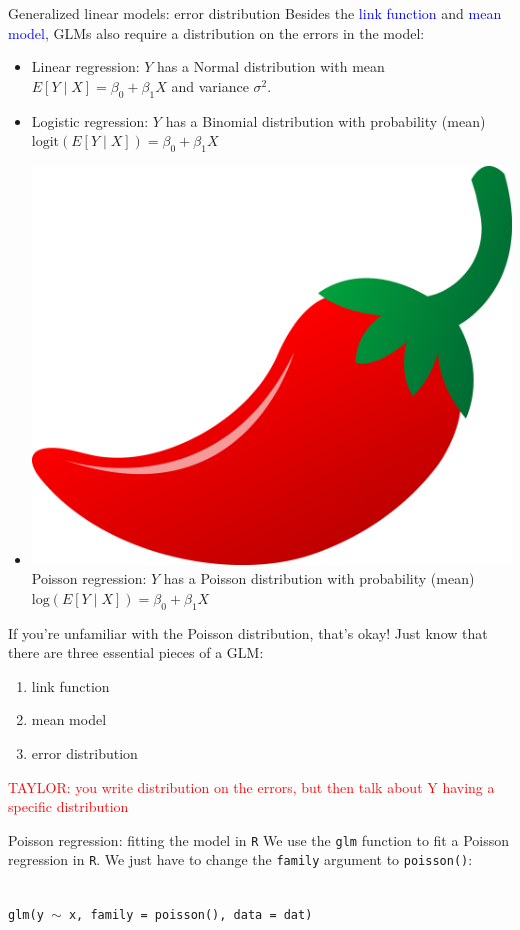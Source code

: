 \documentclass[10pt,t]{beamer}
\begin{document}
\begin{frame}{Generalized linear models: error distribution}
	Besides the \textcolor{blue}{link function} and \textcolor{blue}{mean model}, GLMs also require a distribution on the errors in the model:
	\begin{itemize}
		\item Linear regression: $Y$ has a Normal distribution with mean $E[Y \mid X] = \beta_0 + \beta_1X$ and variance $\sigma^2$.
		\item Logistic regression: $Y$ has a Binomial distribution with probability (mean) $\text{logit}(E[Y \mid X]) = \beta_0 + \beta_1X$
		\item \includegraphics[scale=0.01]{./figs/chilipepper} Poisson regression: $Y$ has a Poisson distribution with probability (mean) $\text{log}(E[Y \mid X]) = \beta_0 + \beta_1X$
	\end{itemize}
	If you're unfamiliar with the Poisson distribution, that's okay! Just know that there are three essential pieces of a GLM: 
	\begin{enumerate}
		\item link function 
		\item mean model
		\item error distribution
	\end{enumerate}
\textcolor{red}{TAYLOR: you write distribution on the errors, but then talk about Y having a specific distribution}
\end{frame}

\begin{frame}{Poisson regression: fitting the model in \texttt{R}}
	We use the \texttt{glm} function to fit a Poisson regression in \texttt{R}. We just have to change the \texttt{family} argument to \texttt{poisson()}:
	\\ ~\
	
	\texttt{glm(y $\sim$ x, family = poisson(), data = dat)}
\end{frame}
\end{document}
